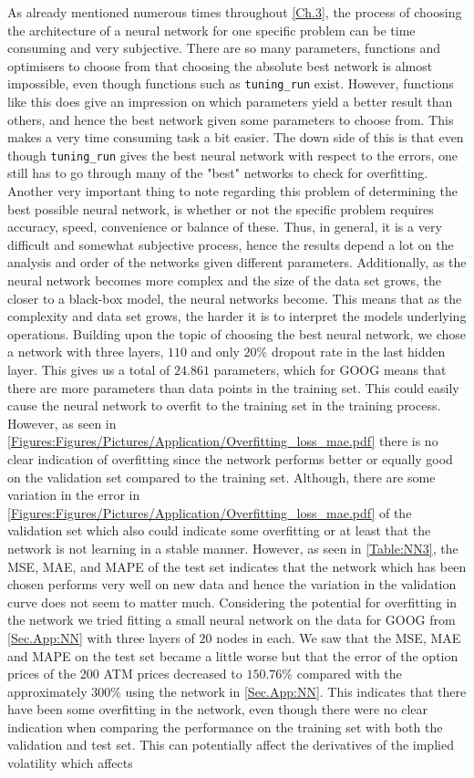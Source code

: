 As already mentioned numerous times throughout \autoref{Ch.3}, the process of choosing the architecture of a neural network for one specific problem can be time consuming and very subjective. There are so many parameters, functions and optimisers to choose from that choosing the absolute best network is almost impossible, even though functions such as \lstinline{tuning_run} exist. However, functions like this does give an impression on which parameters yield a better result than others, and hence the best network given some parameters to choose from. This makes a very time consuming task a bit easier. The down side of this is that even though \lstinline{tuning_run} gives the best neural network with respect to the errors, one still has to go through many of the "best" networks to check for overfitting. Another very important thing to note regarding this problem of determining the best possible neural network, is whether or not the specific problem requires accuracy, speed, convenience or balance of these. Thus, in general, it is a very difficult and somewhat subjective process, hence the results depend a lot on the analysis and order of the networks given different parameters. Additionally, as the neural network becomes more complex and the size of the data set grows, the closer to a black-box model, the neural networks become. This means that as the complexity and data set grows, the harder it is to interpret the models underlying operations. Building upon the topic of choosing the best neural network, we chose a network with three layers, $110$ and only $20\%$ dropout rate in the last hidden layer. This gives us a total of $24.861$ parameters, which for GOOG means that there are more parameters than data points in the training set. This could easily cause the neural network to overfit to the training set in the training process. However, as seen in \autoref{Figures:Figures/Pictures/Application/Overfitting_loss_mae.pdf} there is no clear indication of overfitting since the network performs better or equally good on the validation set compared to the training set. Although, there are some variation in the error in \autoref{Figures:Figures/Pictures/Application/Overfitting_loss_mae.pdf} of the validation set which also could indicate some overfitting or at least that the network is not learning in a stable manner. However, as seen in \autoref{Table:NN3}, the MSE, MAE, and MAPE of the test set indicates that the network which has been chosen performs very well on new data and hence the variation in the validation curve does not seem to matter much. Considering the potential for overfitting in the network we tried fitting a small neural network on the data for GOOG from \autoref{Sec.App:NN} with three layers of $20$ nodes in each. We saw that the MSE, MAE and MAPE on the test set became a little worse but that the error of the option prices of the 200 ATM prices decreased to $150.76\%$ compared with the approximately $300\%$ using the network in \autoref{Sec.App:NN}. This indicates that there have been some overfitting in the network, even though there were no clear indication when comparing the performance on the training set with both the validation and test set. This can potentially affect the derivatives of the implied volatility which affects 